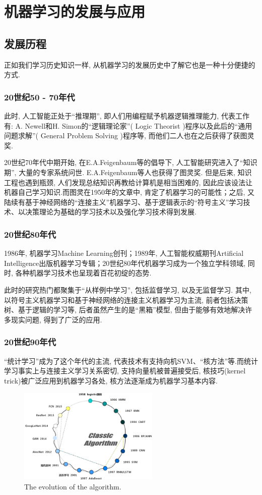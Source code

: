 \documentclass[lang=cn,11pt,a4paper]{elegantpaper}
\begin{document}
\section{机器学习的发展与应用}
\subsection{发展历程}
\par 正如我们学习历史知识一样, 从机器学习的发展历史中了解它也是一种十分便捷的方式. 
\subsubsection*{20世纪50 - 70年代}
\par 此时, 人工智能正处于“推理期”, 即人们用编程赋予机器逻辑推理能力, 代表工作有: A. Newell和H. Simon的“逻辑理论家”( Logic Theorist )程序以及此后的“通用问题求解”( General Problem Solving )程序等, 而他们二人也在之后获得了获图灵奖. 
\par 20世纪70年代中期开始, 在E.A.Feigenbaum等的倡导下, 人工智能研究进入了“知识期”, 大量的专家系统问世. E.A.Feigenbaum等人也获得了图灵奖. 但是后来, 知识工程也遇到瓶颈, 人们发现总结知识再教给计算机是相当困难的, 因此应该设法让机器自己学习知识.而图灵在1950年的文章中, 肯定了机器学习的可能性；之后, 又陆续有基于神经网络的“连接主义”机器学习、基于逻辑表示的“符号主义”学习技术、以决策理论为基础的学习技术以及强化学习技术得到发展.
\subsubsection*{20世纪80年代}
\par 1986年, 机器学习Machine Learning创刊；1989年, 人工智能权威期刊Artificial Intelligence出版机器学习专辑；20世纪80年代机器学习成为一个独立学科领域, 同时, 各种机器学习技术也呈现着百花初绽的态势.
\par 此时的研究热门都聚集于“从样例中学习”, 包括监督学习, 以及无监督学习. 其中, 以符号主义机器学习和基于神经网络的连接主义机器学习为主流, 前者包括决策树、基于逻辑的学习等, 后者虽然产生的是“黑箱”模型, 但由于能够有效地解决许多现实问题, 得到了广泛的应用.
\subsubsection*{20世纪90年代}
“统计学习”成为了这个年代的主流, 代表技术有支持向机SVM、“核方法”等.而统计学习事实上与连接主义学习关系密切, 支持向量机被普遍接受后, 核技巧(kernel trick)被广泛应用到机器学习各处, 核方法逐渐成为机器学习基本内容.
\begin{figure}[htbp]
	\centering
	\includegraphics[width=0.6\textwidth]{SF}
  	\caption{The evolution of the algorithm.\label{fig:SF}}
\end{figure}
\end{document}
